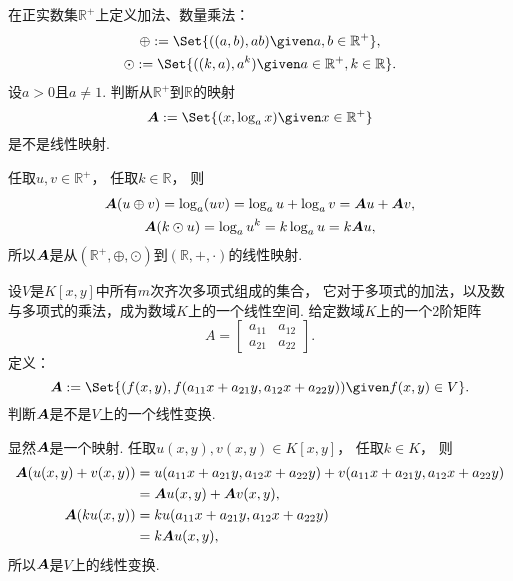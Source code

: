 \begin{example}
在正实数集\(\mathbb{R}^+\)上定义加法、数量乘法：\begin{gather*}
	\oplus \defeq \Set{
		((a,b),ab)
		\given
		a,b \in \mathbb{R}^+
	}, \\
	\odot \defeq \Set{
		((k,a),a^k)
		\given
		a \in \mathbb{R}^+,
		k \in \mathbb{R}
	}.
\end{gather*}
设\(a>0\)且\(a\neq1\).
判断从\(\mathbb{R}^+\)到\(\mathbb{R}\)的映射\[
	\vb{A} \defeq \Set{
		(x,\log_a x)
		\given
		x \in \mathbb{R}^+
	}
\]是不是线性映射.
\begin{solution}
任取\(u,v\in\mathbb{R}^+\)，
任取\(k\in\mathbb{R}\)，
则\begin{gather*}
	\boldsymbol{A}(u \oplus v)
	= \log_a (u v)
	= \log_a u + \log_a v
	= \boldsymbol{A}u + \boldsymbol{A}v, \\
	\boldsymbol{A}(k \odot u)
	= \log_a u^k
	= k \log_a u
	= k \boldsymbol{A}u,
\end{gather*}
所以\(\boldsymbol{A}\)是从\((\mathbb{R}^+,\oplus,\odot)\)到\((\mathbb{R},+,\cdot)\)的线性映射.
\end{solution}
\end{example}

\begin{example}
设\(V\)是\(K[x,y]\)中所有\(m\)次齐次多项式组成的集合，
它对于多项式的加法，以及数与多项式的乘法，成为数域\(K\)上的一个线性空间.
给定数域\(K\)上的一个2阶矩阵\begin{equation*}
	A = \begin{bmatrix}
		a_{11} & a_{12} \\
		a_{21} & a_{22}
	\end{bmatrix}.
\end{equation*}
定义：\begin{equation*}
	\vb{A} \defeq \Set{
		(f(x,y),f(a_{11}x+a_{21}y,a_{12}x+a_{22}y))
		\given
		f(x,y) \in V
	}.
\end{equation*}
判断\(\boldsymbol{A}\)是不是\(V\)上的一个线性变换.
\begin{solution}
显然\(\boldsymbol{A}\)是一个映射.
任取\(u(x,y),v(x,y) \in K[x,y]\)，
任取\(k \in K\)，
则\begin{align*}
	\boldsymbol{A}(u(x,y) + v(x,y))
	&= u(a_{11}x+a_{21}y,a_{12}x+a_{22}y) + v(a_{11}x+a_{21}y,a_{12}x+a_{22}y) \\
	&= \boldsymbol{A}u(x,y) + \boldsymbol{A}v(x,y), \\
	\boldsymbol{A}(k u(x,y))
	&= k u(a_{11}x+a_{21}y,a_{12}x+a_{22}y) \\
	&= k \boldsymbol{A}u(x,y),
\end{align*}
所以\(\boldsymbol{A}\)是\(V\)上的线性变换.
\end{solution}
\end{example}

